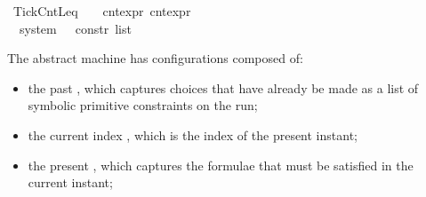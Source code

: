 \begin{isabellebody}
%
\isanewline
{\isacharbar}\ TickCntLeq\ \ \ \ {\isacartoucheopen}cnt{\isacharunderscore}expr{\isacartoucheclose}\ {\isacartoucheopen}cnt{\isacharunderscore}expr{\isacartoucheclose}\ \ \ \ \ \ \ \ \ \ \ \ \ \ \ \ \ \ \ \ \ \ \ \ \ \ \ \ {\isacharparenleft}{\isacartoucheopen}{\isacharunderscore}\ {\isasympreceq}\ {\isacharunderscore}{\isacartoucheclose}{\isacharparenright}\isanewline
\isanewline
{}\isamarkupfalse%
\ {\isacharprime}{\isasymtau}\ system\ {\isacharequal}\ {\isacartoucheopen}{\isacharprime}{\isasymtau}\ constr\ list{\isacartoucheclose}%
\begin{isamarkuptext}%
The abstract machine has configurations composed of:

%
\begin{itemize}%
\item the past \isa{{\isasymGamma}}, which captures choices that have already be made as a 
list of symbolic primitive constraints on the run;

\item the current index , which is the index of the present instant;

\item the present \isa{{\isasymPsi}}, which captures the formulae that must be satisfied
in the current instant;


\end{itemize}
\end{isamarkuptext}
\end{isabellebody}

